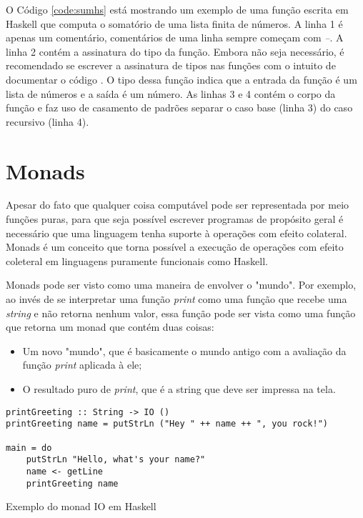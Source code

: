 O Código \ref{code:sumhs} está mostrando um exemplo de uma função escrita em Haskell que computa o somatório de uma lista finita de números. A linha 1 é apenas um comentário, comentários de uma linha sempre começam com \emph{--}. A linha 2 contém a assinatura do tipo da função. Embora não seja necessário, é recomendado se escrever a assinatura de tipos nas funções com o intuito de documentar o código \cite{jones2007practical}. O tipo dessa função indica que a entrada da função é um lista de números e a saída é um número. As linhas 3 e 4 contém o corpo da função e faz uso de casamento de padrões separar o caso base (linha 3) do caso recursivo (linha 4).


\section{Monads}

Apesar do fato que qualquer coisa computável pode ser representada por meio funções puras, para que seja possível escrever programas de propósito geral é necessário que uma linguagem tenha suporte à operações com efeito colateral. Monads é um conceito que torna possível a execução de operações com efeito coleteral em linguagens puramente funcionais como Haskell.

Monads pode ser visto como uma maneira de envolver o "mundo". Por exemplo, ao invés de se interpretar uma função \emph{print} como uma função que recebe uma \emph{string} e não retorna nenhum valor, essa função pode ser vista como uma função que retorna um monad que contém duas coisas:
\begin{itemize}
  \item Um novo "mundo", que é basicamente o mundo antigo com a avaliação da função \emph{print} aplicada à ele;
  \item O resultado puro de \emph{print}, que é a string que deve ser impressa na tela.
\end{itemize}

\begin{listing}
  \begin{verbatim}
printGreeting :: String -> IO ()
printGreeting name = putStrLn ("Hey " ++ name ++ ", you rock!")

main = do
    putStrLn "Hello, what's your name?"
    name <- getLine
    printGreeting name
  \end{verbatim}
  \caption{Exemplo do monad IO em Haskell}
  \label{code:monad}
\end{listing}

